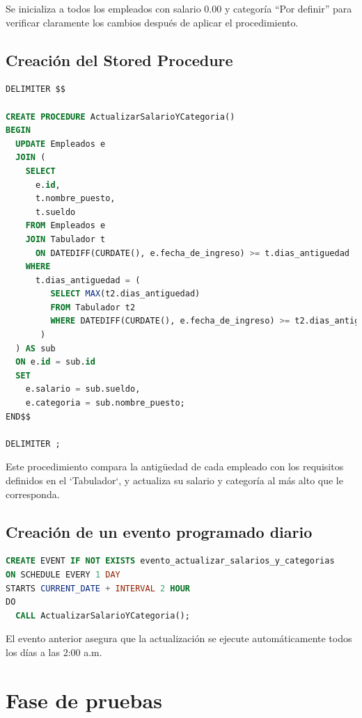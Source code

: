 \documentclass[12pt]{article}
\begin{document}
Se inicializa a todos los empleados con salario 0.00 y categoría ``Por definir'' para verificar claramente los cambios después de aplicar el procedimiento.

\subsection*{Creación del Stored Procedure}

\begin{lstlisting}[language=SQL]
DELIMITER $$

CREATE PROCEDURE ActualizarSalarioYCategoria()
BEGIN
  UPDATE Empleados e
  JOIN (
    SELECT 
      e.id,
      t.nombre_puesto,
      t.sueldo
    FROM Empleados e
    JOIN Tabulador t
      ON DATEDIFF(CURDATE(), e.fecha_de_ingreso) >= t.dias_antiguedad
    WHERE
      t.dias_antiguedad = (
         SELECT MAX(t2.dias_antiguedad)
         FROM Tabulador t2
         WHERE DATEDIFF(CURDATE(), e.fecha_de_ingreso) >= t2.dias_antiguedad
       )
  ) AS sub
  ON e.id = sub.id
  SET 
    e.salario = sub.sueldo,
    e.categoria = sub.nombre_puesto;
END$$

DELIMITER ;
\end{lstlisting}

Este procedimiento compara la antigüedad de cada empleado con los requisitos definidos en el `Tabulador`, y actualiza su salario y categoría al más alto que le corresponda.

\subsection*{Creación de un evento programado diario}

\begin{lstlisting}[language=SQL]
CREATE EVENT IF NOT EXISTS evento_actualizar_salarios_y_categorias
ON SCHEDULE EVERY 1 DAY
STARTS CURRENT_DATE + INTERVAL 2 HOUR
DO
  CALL ActualizarSalarioYCategoria();
\end{lstlisting}

El evento anterior asegura que la actualización se ejecute automáticamente todos los días a las 2:00 a.m.

\section*{Fase de pruebas}
\end{document}
